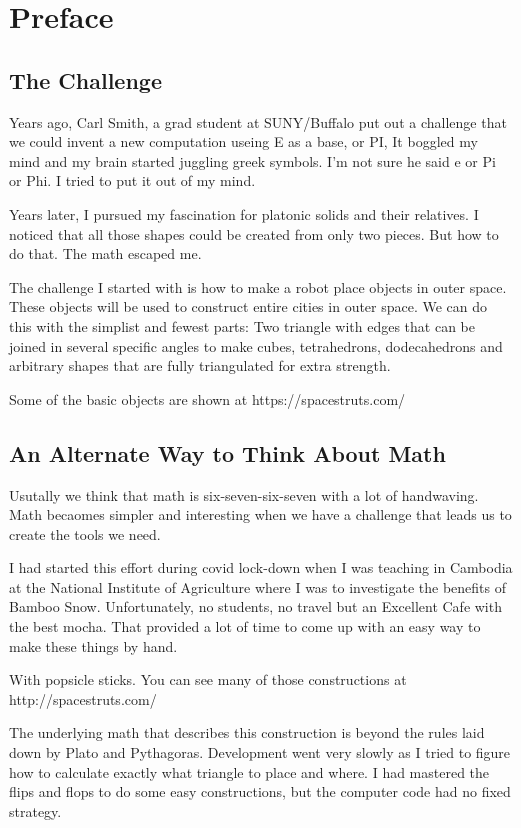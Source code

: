 \chapter*{Preface}

\section*{The Challenge}

Years ago, Carl Smith, a grad student at SUNY/Buffalo put out a challenge that we could invent a new computation useing E as a base, or PI, It boggled my mind and my brain started juggling greek symbols. I'm not sure he said e or Pi or Phi. I tried to put it out of my mind.

Years later, I pursued my fascination for platonic solids and their relatives. I noticed that all those shapes could be created from only two pieces. But how to do that. The math escaped me.

The challenge I started with is how to make a robot place objects in outer space. These objects will be used to construct entire cities in outer space. We can do this with the simplist and fewest parts: Two triangle with edges that can be joined in several specific angles to make cubes, tetrahedrons, dodecahedrons and arbitrary shapes that are fully triangulated for extra strength.

Some of the basic objects are shown at https://spacestruts.com/

\section*{An Alternate Way to Think About Math}

Usutally we think that math is six-seven-six-seven with a lot of handwaving. Math becaomes simpler and interesting when we have a challenge that leads us to create the tools we need.

I had started this effort during covid lock-down when I was teaching in Cambodia at the National Institute of Agriculture where I was to investigate the benefits of Bamboo Snow. Unfortunately, no students, no travel but an Excellent Cafe with the best mocha. That provided a lot of time to come up with an easy way to make these things by hand.

With popsicle sticks. You can see many of those constructions at http://spacestruts.com/

The underlying math that describes this construction is beyond the rules laid down by Plato and Pythagoras. Development went very slowly as I tried to figure how to calculate exactly what triangle to place and where. I had mastered the flips and flops to do some easy constructions, but the computer code had no fixed strategy.

